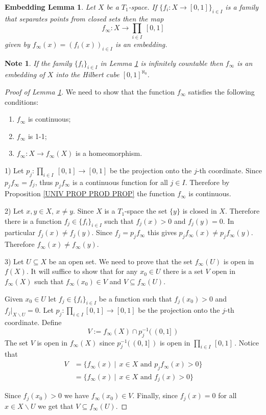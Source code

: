 \documentclass[11pt, letterpaper, oneside]{report}
\theoremstyle{pplain}
\newtheorem{ITERMVALUE THM}[theorem]{Intermediate Value Theorem}
\newtheorem{HEINEBOREL THM}[theorem]{Heine-Borel Theorem}
\newtheorem{UMETR THM}[theorem]{Urysohn Metrization Theorem}
\newtheorem{UMETR2 THM}[theorem]{Urysohn Metrization Theorem (v.2)}
\newtheorem{EMBEDDINGL}[theorem]{Embedding Lemma}
\theoremstyle{ddefinition}
\newtheorem{note}[theorem]{Note}
\theoremstyle{nnn}
\newtheorem{TDA NN}[theorem]{Topological Data Analysis. }
\theoremstyle{eexercise}
\newcommand{\ssmin}{\smallsetminus}
\newcommand{\benu}{\begin{enumerate}}
\newcommand{\eenu}{\end{enumerate}}
\begin{document}
\begin{EMBEDDINGL}
\label{EMBEDDING LEMMA}
Let $X$ be a $T_{1}$-space. If  $\{f_{i}\colon X \to [0, 1]\}_{i\in I}$ is a family 
that separates points from closed sets then the map 
$$f_{\infty}\colon X \to \prod_{i\in I} \ [0, 1]$$
given by $f_{\infty}(x) = (f_{i}(x))_{i\in I}$ is an embedding. 
\end{EMBEDDINGL}


\begin{note}
If the family $\{f_{i}\}_{i\in I}$ in Lemma \ref{EMBEDDING LEMMA} is infinitely 
countable then $f_{\infty}$ is an embedding of $X$ into the Hilbert cube $[0, 1]^{\aleph_{0}}$.
\end{note}


\begin{proof}[Proof of Lemma \ref{EMBEDDING LEMMA}]
We need to show that the function $f_{\infty}$ satisfies the following conditions:
\benu
\item $f_{\infty}$ is continuous;
\item $f_{\infty}$ is 1-1;
\item $f_{\infty}\colon X \to f_{\infty}(X)$ is a homeomorphism. 
\eenu

1) Let $p_{j}\colon \prod_{i\in I} \ [0, 1] \to [0, 1]$ be the projection onto the $j$-th coordinate. 
Since $p_{j}f_{\infty} = f_{j}$, thus $p_{j}f_{\infty}$ is a continuous function for all $j\in I$. 
Therefore by Proposition \ref{UNIV PROP PROD PROP} the function $f_{\infty}$ is continuous.   

2) Let $x, y\in X$, $x\neq y$. Since $X$ is a $T_{1}$-space the set $\{y\}$ is 
closed in $X$. Therefore there is a function $f_{j}\in \{f_{i}\}_{i\in I}$
such that $f_{j}(x) > 0$ and $f_{j}(y) = 0$. In particular $f_{j}(x) \neq f_{j}(y)$.  
Since $f_{j} = p_{j}f_{\infty}$ this gives 
$p_{j}f_{\infty}(x) \neq p_{j}f_{\infty}(y)$. Therefore $f_{\infty}(x)\neq f_{\infty}(y)$.

3) Let  $U\subseteq X$ be an open set. We need to prove that the set $f_{\infty}(U)$ is  open 
in $f(X)$.  It will suffice to show that for any  $x_{0}\in U$ there is a set $V$ open in $f_{\infty}(X)$
such that  $f_{\infty}(x_{0})\in V$  and $V\subseteq f_{\infty}(U)$.

Given $x_{0}\in U$ let $f_{j}\in \{f_{i}\}_{i\in I}$ be a function such that $f_{j}(x_{0}) > 0$
and $f_{j}|_{X\ssmin U} = 0$.   
Let $p_{j}\colon \prod_{i\in I} [0, 1] \to [0, 1]$ be the projection onto the $j$-th coordinate. 
Define 
$$V:= f_{\infty}(X)\cap p_{j}^{-1}(\, (0, 1]\, )$$ 
The set $V$ is open in $f_{\infty}(X)$ since $ p_{j}^{-1}(\, (0, 1]\, )$ is open in $ \prod_{i\in I} \, [0, 1]\, $.
Notice that 
\begin{align*}
V & = \{f_{\infty}(x) \ | \ \ x\in X \text{ and } p_{j}f_{\infty}(x) > 0  \}  \\
& = \{f_{\infty}(x) \ | \ \ x\in X \text{ and } f_{j}(x) > 0  \} 
\end{align*}

Since $f_{j}(x_{0}) >0$ we have $f_{\infty}(x_{0}) \in V$. Finally, since $f_{j}(x) = 0$  for all $x\in X \ssmin U$
we get that $V\subseteq f_{\infty}(U)$.
\end{proof} 
\end{document}
